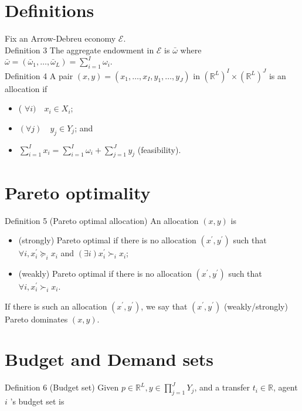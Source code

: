 \documentclass[10pt]{article}
\begin{document}
\section*{Definitions}
Fix an Arrow-Debreu economy $\mathcal{E}$.\\
Definition 3 The aggregate endowment in $\mathcal{E}$ is $\bar{\omega}$ where $\bar{\omega}=\left(\bar{\omega}_{1}, \ldots, \bar{\omega}_{L}\right) =\sum_{i=1}^{I} \omega_{i}$.\\
Definition 4 A pair $(x, y)=\left(x_{1}, \ldots, x_{I}, y_{1}, \ldots, y_{J}\right)$ in $\left(\mathbb{R}^{L}\right)^{I} \times\left(\mathbb{R}^{L}\right)^{J}$ is an allocation if

\begin{itemize}
  \item ( $\forall i) \quad x_{i} \in X_{i}$;
  \item $(\forall j) \quad y_{j} \in Y_{j}$; and
  \item $\sum_{i=1}^{I} x_{i}=\sum_{i=1}^{I} \omega_{i}+\sum_{j=1}^{J} y_{j}$ (feasibility).
\end{itemize}

\section*{Pareto optimality}
Definition 5 (Pareto optimal allocation) An allocation $(x, y)$ is

\begin{itemize}
  \item (strongly) Pareto optimal if there is no allocation $\left(x^{\prime}, y^{\prime}\right)$ such that $\forall i, x_{i}^{\prime} \succeq_{i} x_{i}$ and $(\exists i) x_{i}^{\prime} \succ_{i} x_{i}$;
  \item (weakly) Pareto optimal if there is no allocation $\left(x^{\prime}, y^{\prime}\right)$ such that $\forall i, x_{i}^{\prime} \succ_{i} x_{i}$.
\end{itemize}

If there is such an allocation $\left(x^{\prime}, y^{\prime}\right)$, we say that $\left(x^{\prime}, y^{\prime}\right)$ (weakly/strongly) Pareto dominates $(x, y)$.

\section*{Budget and Demand sets}
Definition 6 (Budget set) Given $p \in \mathbb{R}^{L}, y \in \prod_{j=1}^{J} Y_{j}$, and a transfer $t_{i} \in \mathbb{R}$, agent $i$ 's budget set is
\end{document}
